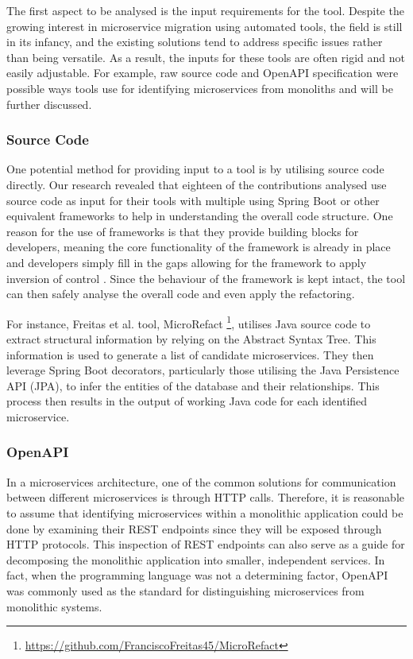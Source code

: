 The first aspect to be analysed is the input requirements for the tool. Despite
the growing interest in microservice migration using automated tools, the field
is still in its infancy, and the existing solutions tend to address specific
issues rather than being versatile. As a result, the inputs for these tools are
often rigid and not easily adjustable. For example, raw source code and OpenAPI
specification were possible ways tools use for identifying microservices from
monoliths and will be further discussed.

\subsubsection*{Source Code}

One potential method for providing input to a tool is by utilising source code
directly. Our research revealed that eighteen of the contributions analysed use
source code as input for their tools with multiple using Spring Boot or other
equivalent frameworks to help in understanding the overall code structure. One
reason for the use of frameworks is that they provide building blocks for
developers, meaning the core functionality of the framework is already in place
and developers simply fill in the gaps allowing for the framework to apply
inversion of control \cite{gamma1995design}. Since the behaviour of the
framework is kept intact, the tool can then safely analyse the overall code and
even apply the refactoring.

For instance, Freitas et al.  tool, MicroRefact
\footnote{\url{https://github.com/FranciscoFreitas45/MicroRefact}}, utilises
Java source code to extract structural information by relying on the Abstract
Syntax Tree. This information is used to generate a list of candidate
microservices. They then leverage Spring Boot decorators, particularly those
utilising the Java Persistence API (JPA), to infer the entities of the database
and their relationships. This process then results in the output of working
Java code for each identified microservice.

\subsubsection*{OpenAPI}

In a microservices architecture, one of the common solutions for communication
between different microservices is through HTTP calls. Therefore, it is
reasonable to assume that identifying microservices within a monolithic
application could be done by examining their REST endpoints since they will be
exposed through HTTP protocols. This inspection of REST endpoints can also
serve as a guide for decomposing the monolithic application into smaller,
independent services. In fact, when the programming language was not a
determining factor, OpenAPI was commonly used as the standard for
distinguishing microservices from monolithic systems.

